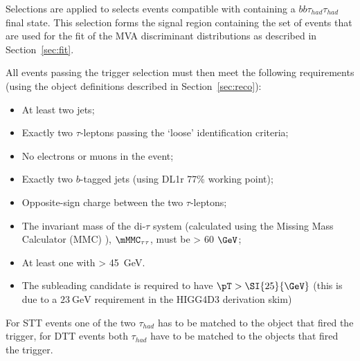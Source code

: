 Selections are applied to selects events compatible with containing a $bb\tau_{had}\tau_{had}$ final state. This selection forms the signal region containing the set of events that are used for the fit of the MVA discriminant distributions as described in Section~\ref{sec:fit}. 

All events passing the trigger selection must then meet the following requirements (using the object definitions described in Section~\ref{sec:reco}):

\begin{itemize}
\item At least two jets;
\item Exactly two $\tau$-leptons passing the `loose' identification criteria;
\item No electrons or muons in the event;
\item Exactly two $b$-tagged jets (using DL1r 77\% working point);
\item Opposite-sign charge between the two $\tau$-leptons;
\item The invariant mass of the di-$\tau$ system (calculated using the Missing Mass Calculator (MMC) \cite{Elagin:2010aw}),
  $\mMMC_{\tau\tau}$, must be > 60 $\GeV$;
\item At least one \bjet with \pT > \SI{45}{\GeV}. %
\item The subleading \tauhad candidate is required to have $\pT > \SI{25}{\GeV}$
  (this is due to a $\SI{23}{\GeV}$ requirement in the HIGG4D3 derivation skim)
\end{itemize}

For STT events one of the two $\tau_{had}$ has to be matched to the object that fired the trigger, for DTT events both $\tau_{had}$ have to be matched to the objects that fired the trigger.

